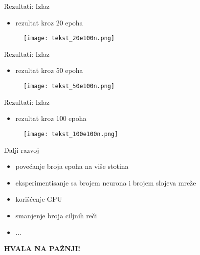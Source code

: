 \documentclass[table]{beamer}
\begin{document}
\begin{frame}{Rezultati: Izlaz}
\begin{itemize}
    \item rezultat kroz 20 epoha
\end{itemize}
\begin{figure}
    \centering
    \texttt{[image: tekst\_20e100n.png]}
\end{figure}

\end{frame}


\begin{frame}{Rezultati: Izlaz}
\begin{itemize}
    \item rezultat kroz 50 epoha
\end{itemize}
\begin{figure}
    \centering
    \texttt{[image: tekst\_50e100n.png]}
\end{figure}

\end{frame}

\begin{frame}{Rezultati: Izlaz}
\begin{itemize}
    \item rezultat kroz 100 epoha
\end{itemize}
\begin{figure}
    \centering
    \texttt{[image: tekst\_100e100n.png]}
\end{figure}
    
\end{frame}

\begin{frame}{Dalji razvoj}
    \begin{itemize}
        \item povećanje broja epoha na više stotina
        \item eksperimentisanje sa brojem neurona i brojem slojeva mreže
        \item korišćenje GPU
        \item smanjenje broja ciljnih reči
        \item ...
    \end{itemize}
\end{frame}

\begin{frame}
\centering
\Large
\textbf{\alert{HVALA NA PAŽNJI!}}

\end{frame}
\end{document}
